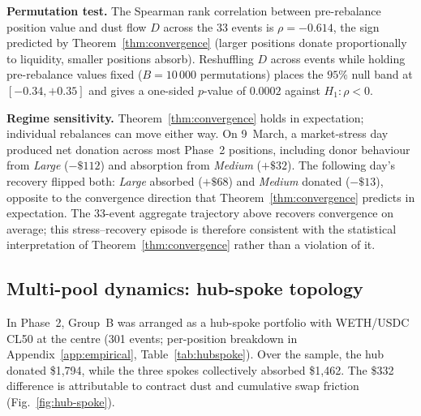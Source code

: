 \documentclass{manuscript}
\begin{document}
\textbf{Permutation test.} The Spearman rank correlation between pre-rebalance position value and dust flow $D$ across the 33 events is $\rho = -0.614$, the sign predicted by Theorem~\ref{thm:convergence} (larger positions donate proportionally to liquidity, smaller positions absorb). Reshuffling $D$ across events while holding pre-rebalance values fixed ($B = 10\,000$ permutations) places the $95\%$ null band at $[-0.34, +0.35]$ and gives a one-sided $p$-value of $0.0002$ against $H_1: \rho < 0$.

\textbf{Regime sensitivity.} Theorem~\ref{thm:convergence} holds in expectation; individual rebalances can move either way. On 9~March, a market-stress day produced net donation across most Phase~2 positions, including donor behaviour from \textit{Large} ($-\$112$) and absorption from \textit{Medium} ($+\$32$). The following day's recovery flipped both: \textit{Large} absorbed ($+\$68$) and \textit{Medium} donated ($-\$13$), opposite to the convergence direction that Theorem~\ref{thm:convergence} predicts in expectation. The 33-event aggregate trajectory above recovers convergence on average; this stress--recovery episode is therefore consistent with the statistical interpretation of Theorem~\ref{thm:convergence} rather than a violation of it.

\subsection{Multi-pool dynamics: hub-spoke topology}\label{sec:hub-spoke}

In Phase~2, Group~B was arranged as a hub-spoke portfolio with WETH/USDC CL50 at the centre (301 events; per-position breakdown in Appendix~\ref{app:empirical}, Table~\ref{tab:hubspoke}). Over the sample, the hub donated \$1{,}794, while the three spokes collectively absorbed \$1{,}462. The \$332 difference is attributable to contract dust and cumulative swap friction (Fig.~\ref{fig:hub-spoke}).
\end{document}
